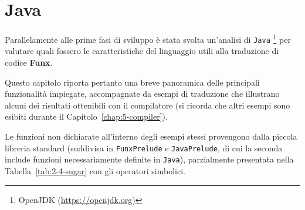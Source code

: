 \chapter{Java}
\label{chap:4-java}

Parallelamente alle prime fasi di sviluppo è stata svolta un'analisi di \texttt{Java}%
\footnote{OpenJDK (\url{https://openjdk.org})}
per valutare quali fossero le caratteristiche del linguaggio utili alla traduzione di codice \textbf{Funx}.

\noindent Questo capitolo riporta pertanto una breve panoramica delle principali funzionalità impiegate,
accompagnate da esempi di traduzione che illustrano alcuni dei risultati ottenibili con il compilatore
(si ricorda che altri esempi sono esibiti durante il Capitolo~\ref{chap:5-compiler}).

Le funzioni non dichiarate all'interno degli esempi stessi provengono dalla piccola libreria standard
(suddivisa in \texttt{FunxPrelude} e \texttt{JavaPrelude}, di cui la seconda include funzioni necessariamente definite in \texttt{Java}),
parzialmente presentata nella Tabella~\ref{tab:2-4-sugar} con gli operatori simbolici.



\newpage



\newpage

